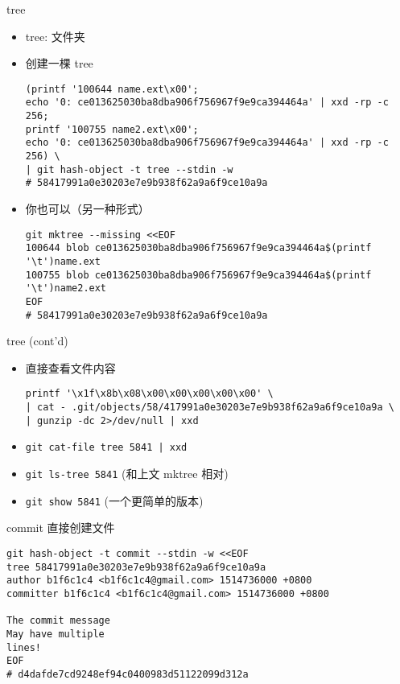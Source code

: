 \documentclass[aspectratio=169]{beamer}
\newcommand{\T}[1]{\texttt{#1}}
\begin{document}
\begin{frame}[fragile]{tree}
  \begin{itemize}
    \item<1-> tree: 文件夹
    \item<2-> 创建一棵 tree\begin{verbatim}
(printf '100644 name.ext\x00';
echo '0: ce013625030ba8dba906f756967f9e9ca394464a' | xxd -rp -c 256;
printf '100755 name2.ext\x00';
echo '0: ce013625030ba8dba906f756967f9e9ca394464a' | xxd -rp -c 256) \
| git hash-object -t tree --stdin -w
# 58417991a0e30203e7e9b938f62a9a6f9ce10a9a
\end{verbatim}
    \item<3-> 你也可以（另一种形式）\begin{verbatim}
git mktree --missing <<EOF
100644 blob ce013625030ba8dba906f756967f9e9ca394464a$(printf '\t')name.ext
100755 blob ce013625030ba8dba906f756967f9e9ca394464a$(printf '\t')name2.ext
EOF
# 58417991a0e30203e7e9b938f62a9a6f9ce10a9a
\end{verbatim}
  \end{itemize}
\end{frame}

\begin{frame}[fragile]{tree (cont'd)}
  \begin{itemize}
    \item<1-> 直接查看文件内容\begin{verbatim}
printf '\x1f\x8b\x08\x00\x00\x00\x00\x00' \
| cat - .git/objects/58/417991a0e30203e7e9b938f62a9a6f9ce10a9a \
| gunzip -dc 2>/dev/null | xxd
\end{verbatim}
    \item<2-> \T{git cat-file tree 5841 | xxd}
    \item<3-> \T{git ls-tree 5841} (和上文 mktree 相对)
    \item<4-> \T{git show 5841} (一个更简单的版本)
  \end{itemize}
\end{frame}

\begin{frame}[fragile]{commit}
  直接创建文件\begin{verbatim}
git hash-object -t commit --stdin -w <<EOF
tree 58417991a0e30203e7e9b938f62a9a6f9ce10a9a
author b1f6c1c4 <b1f6c1c4@gmail.com> 1514736000 +0800
committer b1f6c1c4 <b1f6c1c4@gmail.com> 1514736000 +0800

The commit message
May have multiple
lines!
EOF
# d4dafde7cd9248ef94c0400983d51122099d312a
\end{verbatim}
\end{frame}
\end{document}
